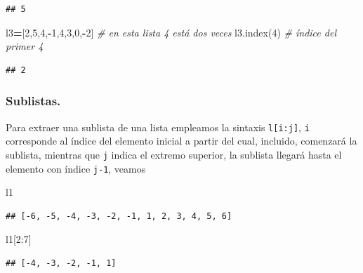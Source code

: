 \documentclass[
]{book}
\newenvironment{Shaded}{\begin{snugshade}}{\end{snugshade}}
\newcommand{\CommentTok}[1]{\textcolor[rgb]{0.56,0.35,0.01}{\textit{#1}}}
\newcommand{\DecValTok}[1]{\textcolor[rgb]{0.00,0.00,0.81}{#1}}
\newcommand{\NormalTok}[1]{#1}
\newcommand{\OperatorTok}[1]{\textcolor[rgb]{0.81,0.36,0.00}{\textbf{#1}}}
\theoremstyle{definition}
\theoremstyle{definition}
\theoremstyle{definition}
\theoremstyle{definition}
\theoremstyle{remark}
\begin{document}
\begin{verbatim}
## 5
\end{verbatim}

\begin{Shaded}
\begin{Highlighting}[]
\NormalTok{l3}\OperatorTok{=}\NormalTok{[}\DecValTok{2}\NormalTok{,}\DecValTok{5}\NormalTok{,}\DecValTok{4}\NormalTok{,}\OperatorTok{{-}}\DecValTok{1}\NormalTok{,}\DecValTok{4}\NormalTok{,}\DecValTok{3}\NormalTok{,}\DecValTok{0}\NormalTok{,}\OperatorTok{{-}}\DecValTok{2}\NormalTok{] }\CommentTok{\# en esta lista 4 está dos veces }
\NormalTok{l3.index(}\DecValTok{4}\NormalTok{) }\CommentTok{\# índice del primer 4 }
\end{Highlighting}
\end{Shaded}

\begin{verbatim}
## 2
\end{verbatim}

\hypertarget{sublistas.}{%
\subsubsection{Sublistas.}\label{sublistas.}}

Para extraer una sublista de una lista empleamos la sintaxis \texttt{l{[}i:j{]}}, \texttt{i} corresponde al índice del elemento inicial a partir del cual, incluido, comenzará la sublista, mientras que \texttt{j} indica el extremo superior, la sublista llegará hasta el elemento con índice \texttt{j-1}, veamos

\begin{Shaded}
\begin{Highlighting}[]
\NormalTok{l1}
\end{Highlighting}
\end{Shaded}

\begin{verbatim}
## [-6, -5, -4, -3, -2, -1, 1, 2, 3, 4, 5, 6]
\end{verbatim}

\begin{Shaded}
\begin{Highlighting}[]
\NormalTok{l1[}\DecValTok{2}\NormalTok{:}\DecValTok{7}\NormalTok{]}
\end{Highlighting}
\end{Shaded}

\begin{verbatim}
## [-4, -3, -2, -1, 1]
\end{verbatim}
\end{document}
